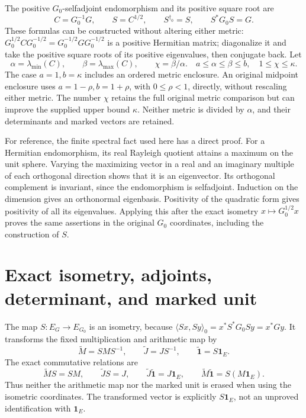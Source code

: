 \documentclass[11pt]{article}
\newcommand{\adjzero}{\dagger_0}
\begin{document}
The positive \(G_0\)-selfadjoint endomorphism and its positive square root are
\begin{equation}
 C=G_0^{-1}G,\qquad S=C^{1/2},\qquad
 S^{\adjzero}=S,\qquad S^*G_0S=G.
 \tag{EM3}\label{EM3}
\end{equation}
These formulas can be constructed without altering either metric:
\(G_0^{1/2}CG_0^{-1/2}=G_0^{-1/2}GG_0^{-1/2}\) is a positive Hermitian
matrix; diagonalize it and take the positive square roots of its positive
eigenvalues, then conjugate back. Let
\begin{equation}
 \alpha=\lambda_{\min}(C),\qquad\beta=\lambda_{\max}(C),\qquad
 \chi=\beta/\alpha.
 \quad a\le\alpha\le\beta\le b,\quad 1\le\chi\le\kappa.
 \tag{EM4}\label{EM4}
\end{equation}
The case \(a=1,b=\kappa\) includes an ordered metric enclosure.
An original midpoint enclosure uses \(a=1-\rho,b=1+\rho\), with
\(0\le\rho<1\), directly, without rescaling either metric.
The number \(\chi\) retains the full original metric comparison but can
improve the supplied upper bound \(\kappa\). Neither metric is divided
by \(\alpha\), and their determinants and marked vectors are retained.

For reference, the finite spectral fact used here has a direct proof.
For a Hermitian endomorphism, its real Rayleigh quotient attains a maximum
on the unit sphere. Varying the maximizing vector in a real and an imaginary
multiple of each orthogonal direction shows that it is an eigenvector.
Its orthogonal complement is invariant, since the endomorphism is
selfadjoint. Induction on the dimension gives an orthonormal eigenbasis.
Positivity of the quadratic form gives positivity of all its eigenvalues.
Applying this after the exact isometry \(x\mapsto G_0^{1/2}x\) proves the
same assertions in the original \(G_0\) coordinates, including the
construction of \(S\).

\section{Exact isometry, adjoints, determinant, and marked unit}

The map \(S:E_G\to E_{G_0}\) is an isometry, because
\(\langle Sx,Sy\rangle_0=x^*S^*G_0Sy=x^*Gy\).
It transforms the fixed multiplication and arithmetic map by
\begin{equation}
 \widetilde M=SMS^{-1},\qquad
 \widetilde J=JS^{-1},\qquad
 \widetilde{\mathbf1}=S\mathbf1_E.
 \tag{EM5}\label{EM5}
\end{equation}
The exact commutative relations are
\begin{equation}
 \widetilde M S=SM,\qquad
 \widetilde J S=J,\qquad
 \widetilde J\widetilde{\mathbf1}=J\mathbf1_E,\qquad
 \widetilde M\widetilde{\mathbf1}=S(M\mathbf1_E).
 \tag{EM6}\label{EM6}
\end{equation}
Thus neither the arithmetic map nor the marked unit is erased when using
the isometric coordinates. The transformed vector is explicitly
\(S\mathbf1_E\), not an unproved identification with \(\mathbf1_E\).
\end{document}

